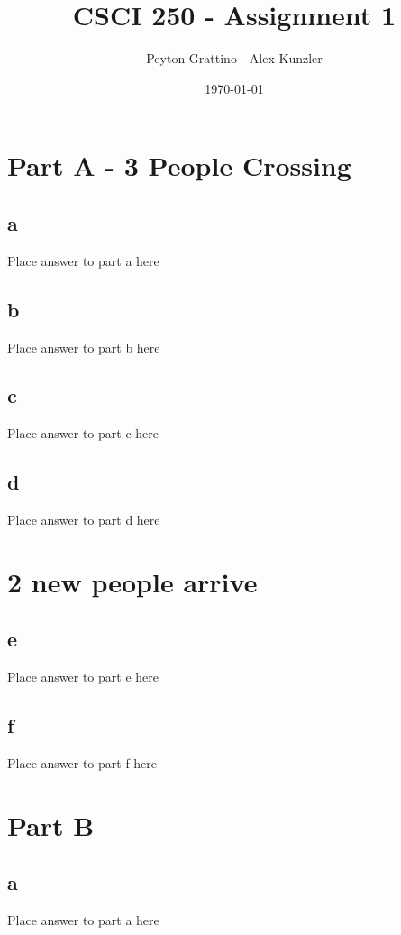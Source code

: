 \documentclass[12pt]{amsart}
\title{CSCI 250 - Assignment 1}
\author{Peyton Grattino - Alex Kunzler}
\date{\today} %
\begin{document}
\maketitle
\tableofcontents

\pagebreak

\section*{Part A - 3 People Crossing}

\subsection*{a}
Place answer to part a here

\subsection*{b}
Place answer to part b here

\subsection*{c}
Place answer to part c here

\subsection*{d}
Place answer to part d here

\section*{2 new people arrive}

\subsection*{e}
Place answer to part e here

\subsection*{f}
Place answer to part f here

\newpage

\section*{Part B}
\subsection*{a}
Place answer to part a here
\end{document}
